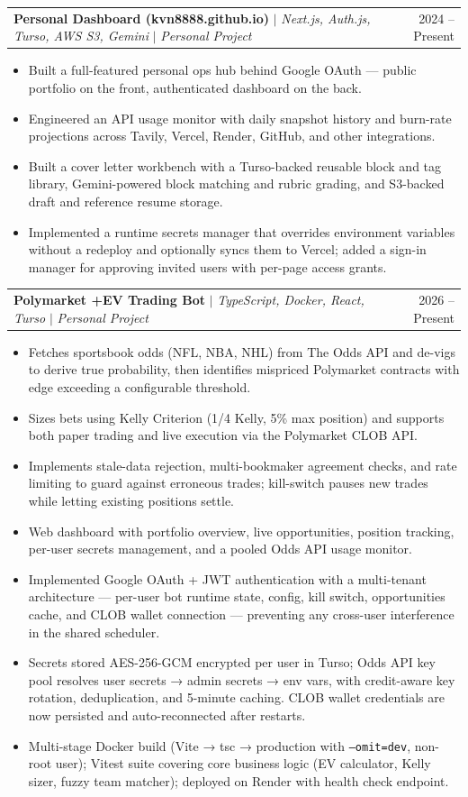 \documentclass[letterpaper,11pt]{article}
\makeatletter
\newcommand{\resumeItem}[1]{
  \item\small{
    {#1 \vspace{-2pt}}
  }
}
\newcommand{\resumeProjectHeading}[2]{
    \item
    \begin{tabular*}{0.97\textwidth}{l@{\extracolsep{\fill}}r}
      \small#1 & #2 \\
    \end{tabular*}\vspace{-7pt}
}
\newcommand{\resumeItemListStart}{\begin{itemize}}
\newcommand{\resumeItemListEnd}{\end{itemize}\vspace{-5pt}}
\makeatother
\begin{document}
    \resumeProjectHeading
        {\textbf{Personal Dashboard (kvn8888.github.io)} $|$ \emph{Next.js, Auth.js, Turso, AWS S3, Gemini} $|$ \emph{Personal Project}}{2024 -- Present}
        \resumeItemListStart
            \resumeItem{Built a full-featured personal ops hub behind Google OAuth — public portfolio on the front, authenticated dashboard on the back.}
            \resumeItem{Engineered an API usage monitor with daily snapshot history and burn-rate projections across Tavily, Vercel, Render, GitHub, and other integrations.}
            \resumeItem{Built a cover letter workbench with a Turso-backed reusable block and tag library, Gemini-powered block matching and rubric grading, and S3-backed draft and reference resume storage.}
            \resumeItem{Implemented a runtime secrets manager that overrides environment variables without a redeploy and optionally syncs them to Vercel; added a sign-in manager for approving invited users with per-page access grants.}
        \resumeItemListEnd

    \resumeProjectHeading
        {\textbf{Polymarket +EV Trading Bot} $|$ \emph{TypeScript, Docker, React, Turso} $|$ \emph{Personal Project}}{2026 -- Present}
        \resumeItemListStart
            \resumeItem{Fetches sportsbook odds (NFL, NBA, NHL) from The Odds API and de-vigs to derive true probability, then identifies mispriced Polymarket contracts with edge exceeding a configurable threshold.}
            \resumeItem{Sizes bets using Kelly Criterion (1/4 Kelly, 5\% max position) and supports both paper trading and live execution via the Polymarket CLOB API.}
            \resumeItem{Implements stale-data rejection, multi-bookmaker agreement checks, and rate limiting to guard against erroneous trades; kill-switch pauses new trades while letting existing positions settle.}
            \resumeItem{Web dashboard with portfolio overview, live opportunities, position tracking, per-user secrets management, and a pooled Odds API usage monitor.}
            \resumeItem{Implemented Google OAuth + JWT authentication with a multi-tenant architecture — per-user bot runtime state, config, kill switch, opportunities cache, and CLOB wallet connection — preventing any cross-user interference in the shared scheduler.}
            \resumeItem{Secrets stored AES-256-GCM encrypted per user in Turso; Odds API key pool resolves user secrets → admin secrets → env vars, with credit-aware key rotation, deduplication, and 5-minute caching. CLOB wallet credentials are now persisted and auto-reconnected after restarts.}
            \resumeItem{Multi-stage Docker build (Vite → tsc → production with \texttt{--omit=dev}, non-root user); Vitest suite covering core business logic (EV calculator, Kelly sizer, fuzzy team matcher); deployed on Render with health check endpoint.}
        \resumeItemListEnd
\end{document}
